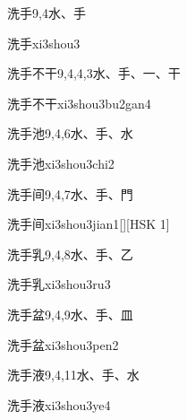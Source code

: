 \begin{entry}{洗手}{9,4}{⽔、⼿}
  \begin{phonetics}{洗手}{xi3shou3}
  \end{phonetics}
\end{entry}

\begin{entry}{洗手不干}{9,4,4,3}{⽔、⼿、⼀、⼲}
  \begin{phonetics}{洗手不干}{xi3shou3bu2gan4}
  \end{phonetics}
\end{entry}

\begin{entry}{洗手池}{9,4,6}{⽔、⼿、⽔}
  \begin{phonetics}{洗手池}{xi3shou3chi2}
  \end{phonetics}
\end{entry}

\begin{entry}{洗手间}{9,4,7}{⽔、⼿、⾨}
  \begin{phonetics}{洗手间}{xi3shou3jian1}[][HSK 1]
  \end{phonetics}
\end{entry}

\begin{entry}{洗手乳}{9,4,8}{⽔、⼿、⼄}
  \begin{phonetics}{洗手乳}{xi3shou3ru3}
  \end{phonetics}
\end{entry}

\begin{entry}{洗手盆}{9,4,9}{⽔、⼿、⽫}
  \begin{phonetics}{洗手盆}{xi3shou3pen2}
  \end{phonetics}
\end{entry}

\begin{entry}{洗手液}{9,4,11}{⽔、⼿、⽔}
  \begin{phonetics}{洗手液}{xi3shou3ye4}
  \end{phonetics}
\end{entry}

